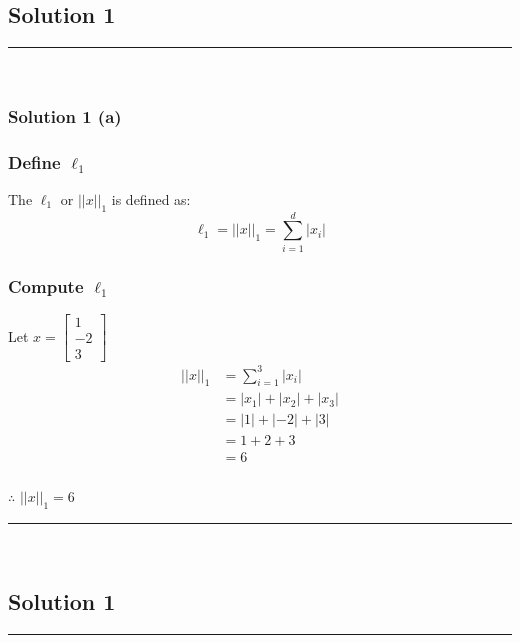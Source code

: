 \documentclass{article}
\begin{document}
\pagestyle{fancy}

\subsection*{Solution 1}
\noindent\rule{\textwidth}{0.4pt}\\

\subsubsection*{Solution 1 (a)}
\subsubsection*{Define $\ell_1$}
\parbox{\textwidth}{
The $\ell_1$ or $||x||_1$ is defined as:
$$\ell_{1} = ||x||_1 = \sum_{i=1}^{d} |x_{i}| $$
}
\subsubsection*{Compute $\ell_1$}
\parbox{\textwidth}{
Let $x=\begin{bmatrix} 1 \\ -2 \\ 3 \end{bmatrix}$ \\

\begin{align*}
  ||x||_1 &= \sum_{i=1}^{3} |x_{i}| \\
  &= |x_{1}| + |x_{2}| + |x_{3}| \\
  &= |1| + |-2| + |3| \\
  &= 1 + 2 + 3 \\
  &= 6
\end{align*}
}


\subsubsection*{\normalfont}{$\therefore$ $||x||_{1} = 6$}

\noindent\rule{\textwidth}{0.4pt}\\

\newpage

\subsection*{Solution 1}
\noindent\rule{\textwidth}{0.4pt}\\
\end{document}
